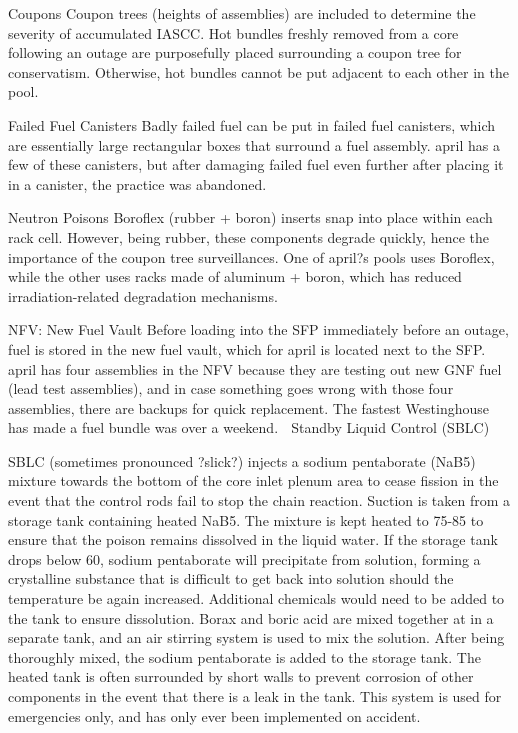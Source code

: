 \documentclass[10pt]{article}
\begin{document}
Coupons
Coupon trees (heights of assemblies) are included to determine the severity of accumulated IASCC. Hot bundles freshly removed from a core following an outage are purposefully placed surrounding a coupon tree for conservatism. Otherwise, hot bundles cannot be put adjacent to each other in the pool. 

Failed Fuel Canisters
Badly failed fuel can be put in failed fuel canisters, which are essentially large rectangular boxes that surround a fuel assembly. april has a few of these canisters, but after damaging failed fuel even further after placing it in a canister, the practice was abandoned. 

Neutron Poisons
Boroflex (rubber + boron) inserts snap into place within each rack cell. However, being rubber, these components degrade quickly, hence the importance of the coupon tree surveillances. One of april?s pools uses Boroflex, while the other uses racks made of aluminum + boron, which has reduced irradiation-related degradation mechanisms. 

NFV: New Fuel Vault
Before loading into the SFP immediately before an outage, fuel is stored in the new fuel vault, which for april is located next to the SFP. april has four assemblies in the NFV because they are testing out new GNF fuel (lead test assemblies), and in case something goes wrong with those four assemblies, there are backups for quick replacement. The fastest Westinghouse has made a fuel bundle was over a weekend. 
Standby Liquid Control (SBLC)

SBLC (sometimes pronounced ?slick?) injects a sodium pentaborate (NaB5) mixture towards the bottom of the core inlet plenum area to cease fission in the event that the control rods fail to stop the chain reaction. Suction is taken from a storage tank containing heated NaB5. The mixture is kept heated to 75-85 to ensure that the poison remains dissolved in the liquid water. If the storage tank drops below 60, sodium pentaborate will precipitate from solution, forming a crystalline substance that is difficult to get back into solution should the temperature be again increased. Additional chemicals would need to be added to the tank to ensure dissolution. Borax and boric acid are mixed together at  in a separate tank, and an air stirring system is used to mix the solution. After being thoroughly mixed, the sodium pentaborate is added to the storage tank. The heated tank is often surrounded by short walls to prevent corrosion of other components in the event that there is a leak in the tank. This system is used for emergencies only, and has only ever been implemented on accident. 
\end{document}
